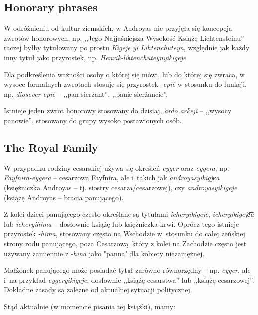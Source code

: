 \subsection{Honorary phrases}

W odróżnieniu od kultur ziemskich, w And́royas nie przyjęła się koncepcja
zwrotów honorowych, np. ,,Jego Najjaśniejsza Wysokość Książę Lichtensteinu''
raczej byłby tytułowany po prostu \emph{Kigeje yi Lihtenchuteyn}, względnie jak
każdy inny tytuł jako przyrostek, np. \emph{Henrik-lihtenchuteynyikigeje}.

Dla podkreślenia ważności osoby o której się mówi, lub do której się zwraca, w
wysoce formalnych zwrotach stosuje się przyrostek \emph{-epié} w stosunku do
funkcji, np. \emph{diosever-epié} -- ,,pan sierżant'', ,,panie sierżancie''.


Istnieje jeden zwrot honorowy stosowany do dzisiaj, \emph{ardo arḱeji} --
,,wysocy panowie'', stosowany do grupy wysoko postawionych osób.

\subsection{The Royal Family}

W przypadku rodziny cesarskiej używa się określeń \emph{eyger} oraz
\emph{eygera}, np. \emph{Fayfnira-eygera} -- cesarzowa Fayfnira, ale i~takich
jak \emph{and́royasyikigje͞a} (księżniczka And́royas -- tj. siostry
cesarza/cesarzowej), czy \emph{and́royasyikigeje} (książę And́royas -- bracia
panującego).

Z kolei dzieci panującego często określane są tytułami \emph{icheryikigeje},
\emph{icheryikigeje͞a} lub \emph{icheryihima} -- dosłownie książę lub
księżniczka krwi. Oprócz tego istnieje przyrostek \emph{-hima}, stosowany często
na Wschodzie w~stosunku do całej żeńskiej strony rodu panującego, poza
Cesarzową, który z kolei na Zachodzie często jest używany zamiennie z
\emph{-hina} jako "panna" dla kobiety niezamężnej.

Małżonek panującego może posiadać tytuł zarówno równorzędny -- np. \emph{eyger},
ale i~na przykład \emph{eygeryikigeje}, dosłownie ,,książę cesarstwa'' lub
,,książę cesarzowej''. Dokładne zasady są zależne od aktualnej sytuacji
politycznej.

Stąd aktualnie (w momencie pisania tej książki), mamy:

